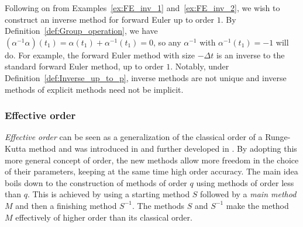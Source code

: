 \begin{example}\label{ex:FE_inv_3}
	Following on from Examples~\ref{ex:FE_inv_1} and~\ref{ex:FE_inv_2}, we wish to construct an inverse method for forward Euler up to order $1$.  By Definition~\ref{def:Group_operation}, we have $(\alpha^{-1}\alpha)(t_1) = \alpha(t_1) + \alpha^{-1}(t_1) = 0$, so any $\alpha^{-1}$ with $\alpha^{-1}(t_1) = -1$ will do. For example, the forward Euler method with size $-\Delta t$ is an inverse to the standard forward Euler method, up to order $1$. Notably, under Definition~\ref{def:Inverse_up_to_p}, inverse methods are not unique and inverse methods of explicit methods need not be implicit.
\end{example}

\subsubsection{Effective order}\label{sec:Effective_order}

\emph{Effective order} can be seen as a generalization of the classical order of a Runge-Kutta method and was introduced in \cite{Butcher1969} and further developed in \cite{Butcher1998, Butcher1996}.
By adopting this more general concept of order, the new methods allow more freedom in the choice of their parameters, keeping at the same time high order accuracy. The main idea boils down to the construction of methods of order $q$
using methods of order less than $q$. This is achieved by using a starting method $S$ followed by a \emph{main method} $M$ %
and then a finishing method $S^{-1}$.
The methods $S$ and $S^{-1}$ make the method $M$ effectively of higher order than its classical order.

